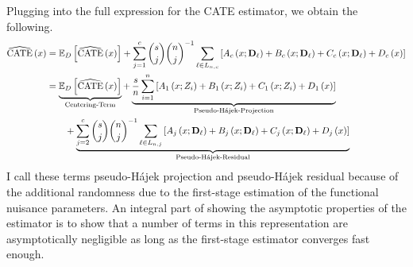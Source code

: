 Plugging into the full expression for the CATE estimator, we obtain the following.
\begin{equation}\label{eq:DNNDML2_Decomp}
    \begin{aligned}
        \widehat{\operatorname{CATE}}\left(x\right)
        & = \mathbb{E}_{D}\left[\widehat{\operatorname{CATE}}\left(x\right)\right] 
        + \sum_{j = 1}^{c} \binom{s}{j} \binom{n}{j}^{-1}\sum_{\ell \in L_{n,c}} \left[A_{c}\left(x; \mathbf{D}_{\ell}\right) + B_{c}\left(x; \mathbf{D}_{\ell}\right) + C_{c}\left(x; \mathbf{D}_{\ell}\right) + D_{c}\left(x\right)\right]\\
        & = \underbrace{\mathbb{E}_{D}\left[\widehat{\operatorname{CATE}}\left(x\right)\right]}_{\text{Centering-Term}}
        + \underbrace{\frac{s}{n} \sum_{i = 1}^{n} \left[A_{1}\left(x; Z_{i}\right) + B_{1}\left(x; Z_{i}\right) + C_{1}\left(x; Z_{i}\right) + D_{1}\left(x\right)\right]}_{\text{Pseudo-H\'ajek-Projection}}\\
        & \quad \quad + \underbrace{\sum_{j = 2}^{c} \binom{s}{j} \binom{n}{j}^{-1}\sum_{\ell \in L_{n,j}} \left[A_{j}\left(x; \mathbf{D}_{\ell}\right) + B_{j}\left(x; \mathbf{D}_{\ell}\right) + C_{j}\left(x; \mathbf{D}_{\ell}\right) + D_{j}\left(x\right)\right]}_{\text{Pseudo-H\'ajek-Residual}}\\
    \end{aligned}
\end{equation}
I call these terms pseudo-H\'ajek projection and pseudo-H\'ajek residual because of the additional randomness due to the first-stage estimation of the functional nuisance parameters.
An integral part of showing the asymptotic properties of the estimator is to show that a number of terms in this representation are asymptotically negligible as long as the first-stage estimator converges fast enough.